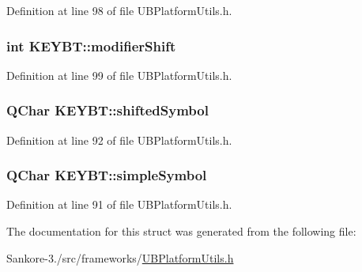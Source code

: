 Definition at line 98 of file U\-B\-Platform\-Utils.\-h.

\hypertarget{struct_k_e_y_b_t_af06d0f98f70310acf5a2ecd97b261f1a}{
\subsubsection[{modifier\-Shift}]{\setlength{\rightskip}{0pt plus 5cm}int K\-E\-Y\-B\-T\-::modifier\-Shift}}\label{d3/dd2/struct_k_e_y_b_t_af06d0f98f70310acf5a2ecd97b261f1a}


Definition at line 99 of file U\-B\-Platform\-Utils.\-h.

\hypertarget{struct_k_e_y_b_t_a7c886876aa3096f3bbcd725e1577483f}{
\subsubsection[{shifted\-Symbol}]{\setlength{\rightskip}{0pt plus 5cm}Q\-Char K\-E\-Y\-B\-T\-::shifted\-Symbol}}\label{d3/dd2/struct_k_e_y_b_t_a7c886876aa3096f3bbcd725e1577483f}


Definition at line 92 of file U\-B\-Platform\-Utils.\-h.

\hypertarget{struct_k_e_y_b_t_a4dddfb1bdd8b6a673aba8ea54fbea59a}{
\subsubsection[{simple\-Symbol}]{\setlength{\rightskip}{0pt plus 5cm}Q\-Char K\-E\-Y\-B\-T\-::simple\-Symbol}}\label{d3/dd2/struct_k_e_y_b_t_a4dddfb1bdd8b6a673aba8ea54fbea59a}


Definition at line 91 of file U\-B\-Platform\-Utils.\-h.



The documentation for this struct was generated from the following file\-:\begin{DoxyCompactItemize}
\item 
Sankore-\/3./src/frameworks/\hyperlink{_u_b_platform_utils_8h}{U\-B\-Platform\-Utils.\-h}\end{DoxyCompactItemize}
